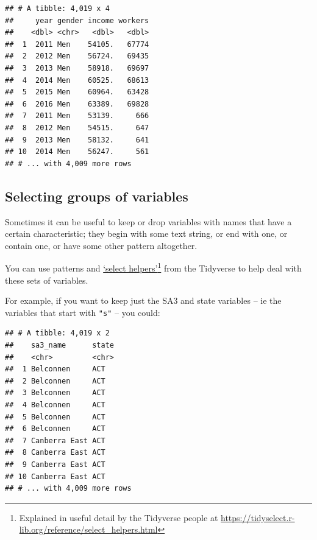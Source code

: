 \documentclass[]{book}
\newenvironment{Shaded}{\begin{snugshade}}{\end{snugshade}}
\newcommand{\KeywordTok}[1]{\textcolor[rgb]{0.13,0.29,0.53}{\textbf{#1}}}
\newcommand{\NormalTok}[1]{#1}
\newcommand{\OperatorTok}[1]{\textcolor[rgb]{0.81,0.36,0.00}{\textbf{#1}}}
\newcommand{\StringTok}[1]{\textcolor[rgb]{0.31,0.60,0.02}{#1}}
\begin{document}
\begin{Shaded}
\end{Shaded}

\begin{verbatim}
## # A tibble: 4,019 x 4
##     year gender income workers
##    <dbl> <chr>   <dbl>   <dbl>
##  1  2011 Men    54105.   67774
##  2  2012 Men    56724.   69435
##  3  2013 Men    58918.   69697
##  4  2014 Men    60525.   68613
##  5  2015 Men    60964.   63428
##  6  2016 Men    63389.   69828
##  7  2011 Men    53139.     666
##  8  2012 Men    54515.     647
##  9  2013 Men    58132.     641
## 10  2014 Men    56247.     561
## # ... with 4,009 more rows
\end{verbatim}

\hypertarget{selecting-groups-of-variables}{%
\subsection{Selecting groups of variables}\label{selecting-groups-of-variables}}

Sometimes it can be useful to keep or drop variables with names that have a certain characteristic; they begin with some text string, or end with one, or contain one, or have some other pattern altogether.

You can use patterns and \href{https://tidyselect.r-lib.org/reference/select_helpers.html}{`select helpers'}\footnote{Explained in useful detail by the Tidyverse people at \url{https://tidyselect.r-lib.org/reference/select_helpers.html}}
from the Tidyverse to help deal with these sets of variables.

For example, if you want to keep just the SA3 and state variables -- ie the variables that start with \texttt{"s"} -- you could:

\begin{Shaded}
\end{Shaded}

\begin{verbatim}
## # A tibble: 4,019 x 2
##    sa3_name      state
##    <chr>         <chr>
##  1 Belconnen     ACT  
##  2 Belconnen     ACT  
##  3 Belconnen     ACT  
##  4 Belconnen     ACT  
##  5 Belconnen     ACT  
##  6 Belconnen     ACT  
##  7 Canberra East ACT  
##  8 Canberra East ACT  
##  9 Canberra East ACT  
## 10 Canberra East ACT  
## # ... with 4,009 more rows
\end{verbatim}
\end{document}
